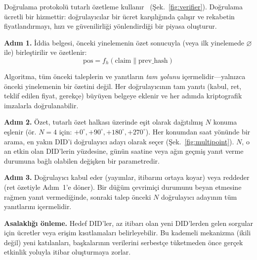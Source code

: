 \documentclass[11pt,a4paper,twocolumn]{article}
\begin{document}
Doğrulama protokolü tutarlı özetleme kullanır~\cite{karger1997} (Şek.~\ref{fig:verifier}). Doğrulama ücretli bir hizmettir: doğrulayıcılar bir ücret karşılığında çalışır ve rekabetin fiyatlandırmayı, hızı ve güvenilirliği yönlendirdiği bir piyasa oluşturur.

\textbf{Adım 1.} İddia belgesi, önceki yinelemenin özet sonucuyla (veya ilk yinelemede $\varnothing$ ile) birleştirilir ve özetlenir:
\begin{equation}
\text{pos} = f_h(\text{claim} \| \text{prev\_hash})
\label{eq:hash}
\end{equation}

Algoritma, tüm önceki taleplerin ve yanıtların \emph{tam yolunu} içermelidir---yalnızca önceki yinelemenin bir özetini değil. Her doğrulayıcının tam yanıtı (kabul, ret, teklif edilen fiyat, gerekçe) büyüyen belgeye eklenir ve her adımda kriptografik imzalarla doğrulanabilir.

\textbf{Adım 2.} Özet, tutarlı özet halkası üzerinde eşit olarak dağıtılmış $N$ konuma eşlenir (ör. $N=4$ için: $+0^{\circ}, +90^{\circ}, +180^{\circ}, +270^{\circ}$). Her konumdan saat yönünde bir arama, en yakın DID'i doğrulayıcı adayı olarak seçer (Şek.~\ref{fig:multipoint}). $N$, o an etkin olan DID'lerin yüzdesine, günün saatine veya ağın geçmiş yanıt verme durumuna bağlı olabilen değişken bir parametredir.

\textbf{Adım 3.} Doğrulayıcı kabul eder (yayımlar, itibarını ortaya koyar) veya reddeder (ret özetiyle Adım~1'e döner). Bir düğüm çevrimiçi durumunu beyan etmesine rağmen yanıt vermediğinde, sonraki talep önceki $N$ doğrulayıcı adayının tüm yanıtlarını içermelidir.

\textbf{Asalaklığı önleme.} Hedef DID'ler, az itibarı olan yeni DID'lerden gelen sorgular için ücretler veya erişim kısıtlamaları belirleyebilir. Bu kademeli mekanizma (ikili değil) yeni katılanları, başkalarının verilerini serbestçe tüketmeden önce gerçek etkinlik yoluyla itibar oluşturmaya zorlar.
\end{document}
